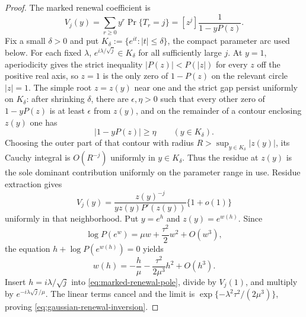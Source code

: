 \begin{proof}
The marked renewal coefficient is
\[
 V_j(y)=\sum_{r\ge0}y^r\Pr\{T_r=j\}
 =[z^j]\frac1{1-yP(z)}.
\]
Fix a small \(\delta>0\) and put
\(K_\delta:=\{e^{it}:|t|\le\delta\}\), the compact parameter arc used below.
For each fixed \(\lambda\), \(e^{i\lambda/\sqrt j}\in K_\delta\) for all
sufficiently large \(j\).
At \(y=1\), aperiodicity gives the strict inequality
\(|P(z)|<P(|z|)\) for every \(z\) off the positive real axis, so \(z=1\) is the
only zero of \(1-P(z)\) on the relevant circle \(|z|=1\).  The simple root
\(z=z(y)\) near one and the strict gap persist uniformly on \(K_\delta\):
after shrinking \(\delta\), there are \(\epsilon,\eta>0\) such that every other
zero of \(1-yP(z)\) is at least \(\epsilon\) from \(z(y)\), and on the remainder
of a contour enclosing \(z(y)\) one has
\[
  |1-yP(z)|\ge\eta\qquad(y\in K_\delta).
\]
Choosing the outer part of that contour with radius
\(R>\sup_{y\in K_\delta}|z(y)|\), its Cauchy integral is \(O(R^{-j})\)
uniformly in \(y\in K_\delta\).  Thus the residue at \(z(y)\) is the sole
dominant contribution uniformly on the parameter range in use.  Residue
extraction gives
\begin{equation}
 V_j(y)=\frac{z(y)^{-j}}{y z(y)P'(z(y))}\{1+o(1)\}
 \label{eq:marked-renewal-pole}
\end{equation}
uniformly in that neighborhood.  Put \(y=e^h\) and \(z(y)=e^{w(h)}\).
Since
\[
 \log P(e^w)=\mu w+\frac{\tau^2}{2}w^2+O(w^3),
\]
the equation \(h+\log P(e^{w(h)})=0\) yields
\[
 w(h)=-\frac h\mu-\frac{\tau^2}{2\mu^3}h^2+O(h^3).
\]
Insert \(h=i\lambda/\sqrt j\) into
\eqref{eq:marked-renewal-pole}, divide by \(V_j(1)\), and multiply by
\(e^{-i\lambda\sqrt j/\mu}\).  The linear terms cancel and the limit is
\(\exp\{-\lambda^2\tau^2/(2\mu^3)\}\), proving
\eqref{eq:gaussian-renewal-inversion}.
\end{proof}

